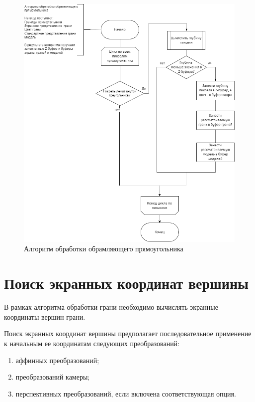 \begin{figure}[h]
	\centering
	\includegraphics[scale=0.57]{inc/img/framing_rect.png}
	\caption{Алгоритм обработки обрамляющего прямоугольника}
	\label{fig:framing_rect}
\end{figure} 

\clearpage

\section{Поиск экранных координат вершины}

В рамках алгоритма обработки грани необходимо вычислять экранные координаты вершин грани.

Поиск экранных координат вершины предполагает последовательное применение к начальным ее координатам следующих преобразований:
\begin{enumerate}
	\item аффинных преобразований;
	\item преобразований камеры;
	\item перспективных преобразований, если включена соответствующая опция.
\end{enumerate}

